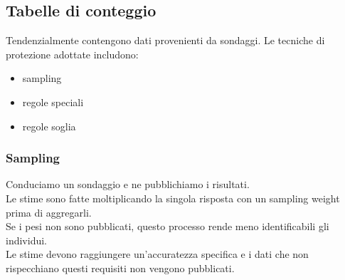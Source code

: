 \subsection{Tabelle di conteggio}
Tendenzialmente contengono dati provenienti da sondaggi. Le tecniche di protezione adottate includono:
\begin{itemize}
    \item sampling
    \item regole speciali
    \item regole soglia
\end{itemize}

\subsubsection{Sampling}
Conduciamo un sondaggio e ne pubblichiamo i risultati.\\
Le stime sono fatte moltiplicando la singola risposta con un sampling weight prima di aggregarli.\\
Se i pesi non sono pubblicati, questo processo rende meno identificabili gli individui. \\
Le stime devono raggiungere un'accuratezza specifica e i dati che non rispecchiano questi requisiti non vengono pubblicati.

